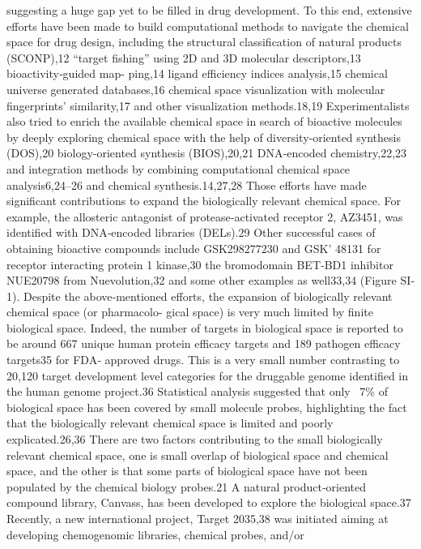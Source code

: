 suggesting a huge gap yet to be filled in drug development. To this end, extensive efforts have been made to build
computational methods to navigate the chemical space for drug design, including the structural classification of
natural products (SCONP),12 “target fishing” using 2D and 3D molecular descriptors,13 bioactivity‐guided map-
ping,14 ligand efficiency indices analysis,15 chemical universe generated databases,16 chemical space visualization
with molecular fingerprints' similarity,17 and other visualization methods.18,19 Experimentalists also tried to enrich
the available chemical space in search of bioactive molecules by deeply exploring chemical space with the help of
diversity‐oriented synthesis (DOS),20 biology‐oriented synthesis (BIOS),20,21 DNA‐encoded chemistry,22,23 and
integration methods by combining computational chemical space analysis6,24–26 and chemical synthesis.14,27,28
Those efforts have made significant contributions to expand the biologically relevant chemical space. For example,
the allosteric antagonist of protease‐activated receptor 2, AZ3451, was identified with DNA‑encoded libraries
(DELs).29 Other successful cases of obtaining bioactive compounds include GSK298277230 and GSK' 48131 for
receptor interacting protein 1 kinase,30 the bromodomain BET‐BD1 inhibitor NUE20798 from Nuevolution,32 and
some other examples as well33,34 (Figure SI‐1).
Despite the above‐mentioned efforts, the expansion of biologically relevant chemical space (or pharmacolo-
gical space) is very much limited by finite biological space. Indeed, the number of targets in biological space is
reported to be around 667 unique human protein efficacy targets and 189 pathogen efficacy targets35 for FDA‐
approved drugs. This is a very small number contrasting to 20,120 target development level categories for the
druggable genome identified in the human genome project.36 Statistical analysis suggested that only ~7\% of
biological space has been covered by small molecule probes, highlighting the fact that the biologically relevant
chemical space is limited and poorly explicated.26,36 There are two factors contributing to the small biologically
relevant chemical space, one is small overlap of biological space and chemical space, and the other is that some
parts of biological space have not been populated by the chemical biology probes.21 A natural product‐oriented
compound library, Canvass, has been developed to explore the biological space.37 Recently, a new international
project, Target 2035,38 was initiated aiming at developing chemogenomic libraries, chemical probes, and/or

